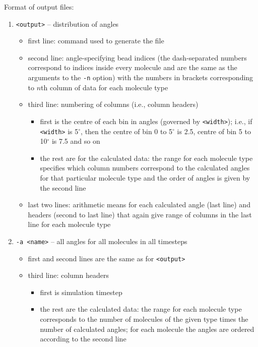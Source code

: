 \noindent
Format of output files:
\begin{enumerate}[nosep,leftmargin=20pt]
  \item \texttt{<output>} -- distribution of angles
    \begin{itemize}[nosep,leftmargin=5pt]
      \item first line: command used to generate the file
      \item second line: angle-specifying bead indices (the dash-separated
        numbers correspond to indices inside every molecule and are the
        same as the arguments to the \texttt{-n} option) with the numbers
        in brackets corresponding to $n$th column of data for each molecule
        type
      \item third line: numbering of columns (i.e., column headers)
        \begin{itemize}[nosep,leftmargin=10pt]
          \item first is the centre of each bin in angles (governed by
            \texttt{<width>}); i.e., if \texttt{<width>} is 5$^{\circ}$,
            then the centre of bin 0 to 5$^{\circ}$ is 2.5, centre of bin 5
            to 10$^{\circ}$ is 7.5 and so on
          \item the rest are for the calculated data: the range for each
            molecule type specifies which column numbers correspond to the
            calculated angles for that particular molecule type and the
            order of angles is given by the second line
        \end{itemize}
      \item last two lines: arithmetic means for each calculated angle
        (last line) and headers (second to last line) that again give range
        of columns in the last line for each molecule type
    \end{itemize}
  \item \texttt{-a <name>} -- all angles for all molecules in all timesteps
  \begin{itemize}[nosep,leftmargin=5pt]
    \item first and second lines are the same as for \texttt{<output>}
    \item third line: column headers
      \begin{itemize}[nosep,leftmargin=10pt]
        \item first is simulation timestep
        \item the rest are the calculated data: the range for each molecule
          type corresponds to the number of molecules of the given type
          times the number of calculated angles; for each molecule the
          angles are ordered according to the second line
      \end{itemize}
  \end{itemize}
\end{enumerate}

